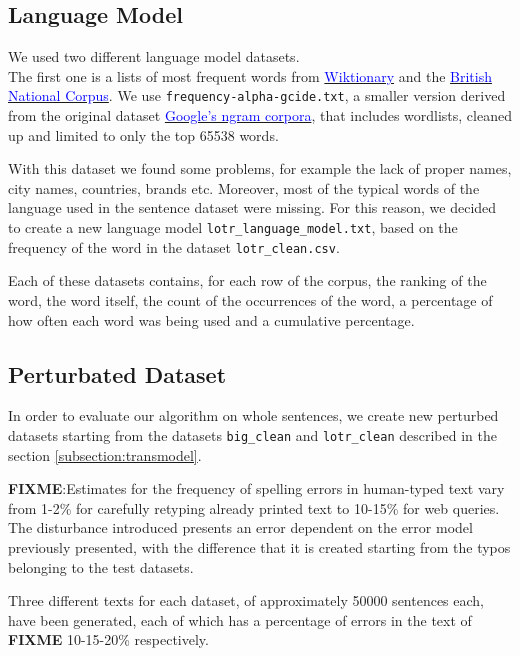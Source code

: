 \subsection{Language Model}
We used two different language model datasets. \\
The first one is a lists of most frequent words from \href{https://en.wiktionary.org/wiki/Wiktionary:Frequency_lists}{ 
\textcolor{blue}{Wiktionary}} and the \href{http://www.kilgarriff.co.uk/bnc-readme.html}{\textcolor{blue}{British National 
Corpus}}. 
We use \texttt{frequency-alpha-gcide.txt}, a smaller version derived from the original dataset 
\href{https://books.google.com/ngrams/}{\textcolor{blue}{Google's ngram corpora}}, that includes wordlists, cleaned up 
and limited to only the top \num{65538} words.

With this dataset we found some problems, for example the lack of proper names, city names, countries, brands etc.
Moreover, most of the typical words of the language used in the sentence dataset were missing.
For this reason, we decided to create a new language model \texttt{lotr\_language\_model.txt}, based on the frequency of 
the word in the dataset \texttt{lotr\_clean.csv}.

Each of these datasets contains, for each row of the corpus, the ranking of the word, the word itself, the count of the 
occurrences of the word, a percentage of how often each word was being used and a cumulative percentage.

\subsection{Perturbated Dataset}
\label{subsection:perturbed}
In order to evaluate our algorithm on whole sentences, we create new perturbed datasets starting from the datasets 
\texttt{big\_clean} and \texttt{lotr\_clean} described in the section \ref{subsection:transmodel}.

\textbf{FIXME}:Estimates for the frequency of spelling errors in human-typed text vary from 1-2\% for carefully retyping 
already printed text to 10-15\% for web queries.
The disturbance introduced presents an error dependent on the error model previously presented, with the 
difference that it is created starting from the typos belonging to the test datasets.

Three different texts for each dataset, of approximately \num{50000} sentences each, have been generated, each of which 
has a percentage of errors in the text of \textbf{FIXME} \num{10}-\num{15}-\num{20}\% respectively. \\

